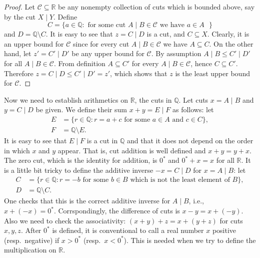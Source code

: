 \begin{proof}
  Let $\mathcal C \subseteq \mathbb R$ be any nonempty collection of cuts which is bounded above, say by the cut $X \mid Y$.  Define
  \[
    C = \{ a \in \mathbb Q \colon \text{ for some cut $A \mid B \in \mathcal C$ we have $a \in A$ } \}
  \]
  and $D = \mathbb Q \setminus C$.
  It is easy to see that $z = C \mid D$ is a cut, and $C \subseteq X$.
  Clearly, it is an upper bound for $\mathcal C$ since for every cut $A \mid B \in \mathcal C$ we have $A \subseteq C$.
  On the other hand, let $z' = C' \mid D'$ be any upper bound for $\mathcal C$.
  By assumption $A \mid B \leqslant C' \mid D'$ for all $A \mid B \in \mathcal C$.
  From definition $A \subseteq C'$ for every $A \mid B \in \mathcal C$, hence $C \subseteq C'$.
  Therefore $z = C \mid D \leqslant C' \mid D' = z'$, which shows that $z$ is the least upper bound for $\mathcal C$.
\end{proof}

Now we need to establish arithmetics on $\mathbb R$, the cuts in $\mathbb Q$.
Let cuts $x = A \mid B$ and $y = C \mid D$ be given.
We define their sum $x + y = E \mid F$ as follows: let
\begin{align*}
  E &= \{ r \in \mathbb Q \colon r = a + c \text{ for some $a \in A$ and $c \in C$} \}, \\
  F &= \mathbb Q \setminus E.
\end{align*}
It is easy to see that $E \mid F$ is a cut in $\mathbb Q$ and that it does not depend on the order in which $x$ and $y$ appear.
That is, cut addition is well defined and $x + y = y + x$.
The zero cut, which is the identity for addition, is $0^*$ and $0^* + x = x$ for all $\mathbb R$.
It is a little bit tricky to define the additive inverse $-x = C \mid D$ for $x = A \mid B$: let
\begin{align*}
  C &= \{ r \in \mathbb Q \colon r = -b \text{ for some $b \in B$ which is not the least element of $B$} \}, \\
  D &= \mathbb Q \setminus C.
\end{align*}
One checks that this is the correct additive inverse for $A \mid B$, i.e., $x + (-x) = 0^*$.
Corrspondingly, the difference of cuts is $x - y = x + (-y)$.
Also we need to check the associativity: $(x+y)+z = x+(y+z)$ for cuts $x,y,z$.
After $0^*$ is defined, it is conventional to call a real number $x$ \textsf{positive} (resp.\ \textsf{negative}) if $x > 0^*$ (resp.\ $x < 0^*$).
This is needed when we try to define the multiplication on $\mathbb R$.

